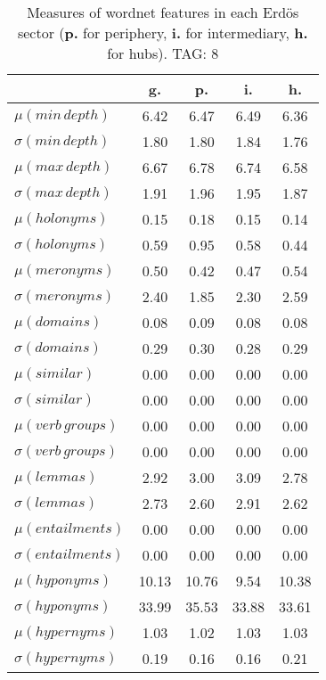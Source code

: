 \begin{table}[h!]
\begin{center}
\begin{tabular}{| l | c | c | c | c |}\hline
 & g. & p. & i. & h. \\\hline
$\mu(min\,depth)$ & 6.42  & 6.47  & 6.49  & 6.36 \\\hline
$\sigma(min\,depth)$ & 1.80  & 1.80  & 1.84  & 1.76 \\\hline
$\mu(max\,depth)$ & 6.67  & 6.78  & 6.74  & 6.58 \\\hline
$\sigma(max\,depth)$ & 1.91  & 1.96  & 1.95  & 1.87 \\\hline
$\mu(holonyms)$ & 0.15  & 0.18  & 0.15  & 0.14 \\\hline
$\sigma(holonyms)$ & 0.59  & 0.95  & 0.58  & 0.44 \\\hline
$\mu(meronyms)$ & 0.50  & 0.42  & 0.47  & 0.54 \\\hline
$\sigma(meronyms)$ & 2.40  & 1.85  & 2.30  & 2.59 \\\hline
$\mu(domains)$ & 0.08  & 0.09  & 0.08  & 0.08 \\\hline
$\sigma(domains)$ & 0.29  & 0.30  & 0.28  & 0.29 \\\hline
$\mu(similar)$ & 0.00  & 0.00  & 0.00  & 0.00 \\\hline
$\sigma(similar)$ & 0.00  & 0.00  & 0.00  & 0.00 \\\hline
$\mu(verb\,groups)$ & 0.00  & 0.00  & 0.00  & 0.00 \\\hline
$\sigma(verb\,groups)$ & 0.00  & 0.00  & 0.00  & 0.00 \\\hline
$\mu(lemmas)$ & 2.92  & 3.00  & 3.09  & 2.78 \\\hline
$\sigma(lemmas)$ & 2.73  & 2.60  & 2.91  & 2.62 \\\hline
$\mu(entailments)$ & 0.00  & 0.00  & 0.00  & 0.00 \\\hline
$\sigma(entailments)$ & 0.00  & 0.00  & 0.00  & 0.00 \\\hline
$\mu(hyponyms)$ & 10.13  & 10.76  & 9.54  & 10.38 \\\hline
$\sigma(hyponyms)$ & 33.99  & 35.53  & 33.88  & 33.61 \\\hline
$\mu(hypernyms)$ & 1.03  & 1.02  & 1.03  & 1.03 \\\hline
$\sigma(hypernyms)$ & 0.19  & 0.16  & 0.16  & 0.21 \\\hline
\end{tabular}
\caption{Measures of wordnet features in each Erd\"os sector ({{\bf p.}} for periphery, {{\bf i.}} for intermediary, {{\bf h.}} for hubs). TAG: 8}
\end{center}
\end{table}